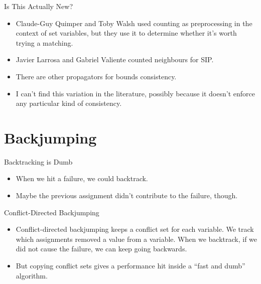\documentclass{beamer}
\begin{document}
\begin{frame}{Is This Actually New?}
    \begin{itemize}
        \item Claude-Guy Quimper and Toby Walsh used counting as preprocessing in the context of set
            variables, but they use it to determine whether it's worth trying a matching.

        \item Javier Larrosa and Gabriel Valiente counted neighbours for SIP.

        \item There are other propagators for bounds consistency.

        \item I can't find this variation in the literature, possibly because it doesn't enforce any
            particular kind of consistency.
    \end{itemize}
\end{frame}

\section{Backjumping}

\frame{\sectionpage}

\begin{frame}{Backtracking is Dumb}
    \begin{itemize}
        \item When we hit a failure, we could backtrack.
        \item Maybe the previous assignment didn't contribute to the failure, though.
    \end{itemize}
\end{frame}

\begin{frame}{Conflict-Directed Backjumping}
    \begin{itemize}
        \item Conflict-directed backjumping keeps a conflict set for each variable. We track
            which assignments removed a value from a variable. When we backtrack, if we did not
            cause the failure, we can keep going backwards.

        \item But copying conflict sets gives a performance hit inside a ``fast and dumb''
            algorithm.
    \end{itemize}
\end{frame}
\end{document}
